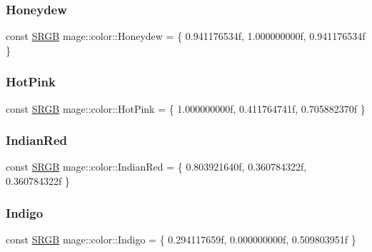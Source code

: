 \subsubsection{\texorpdfstring{Honeydew}{Honeydew}}
{\footnotesize\ttfamily const \hyperlink{structmage_1_1_s_r_g_b}{S\+R\+GB} mage\+::color\+::\+Honeydew = \{ 0.\+941176534f, 1.\+000000000f, 0.\+941176534f \}}

\hypertarget{namespacemage_1_1color_a6c71449f3f78861ed803b42056590c6b}{}\label{namespacemage_1_1color_a6c71449f3f78861ed803b42056590c6b} 
\subsubsection{\texorpdfstring{Hot\+Pink}{HotPink}}
{\footnotesize\ttfamily const \hyperlink{structmage_1_1_s_r_g_b}{S\+R\+GB} mage\+::color\+::\+Hot\+Pink = \{ 1.\+000000000f, 0.\+411764741f, 0.\+705882370f \}}

\hypertarget{namespacemage_1_1color_a2ecd17afc164bd43c8e9235fc1603742}{}\label{namespacemage_1_1color_a2ecd17afc164bd43c8e9235fc1603742} 
\subsubsection{\texorpdfstring{Indian\+Red}{IndianRed}}
{\footnotesize\ttfamily const \hyperlink{structmage_1_1_s_r_g_b}{S\+R\+GB} mage\+::color\+::\+Indian\+Red = \{ 0.\+803921640f, 0.\+360784322f, 0.\+360784322f \}}

\hypertarget{namespacemage_1_1color_a7397ee3a10a75c693c81b667e55f207a}{}\label{namespacemage_1_1color_a7397ee3a10a75c693c81b667e55f207a} 
\subsubsection{\texorpdfstring{Indigo}{Indigo}}
{\footnotesize\ttfamily const \hyperlink{structmage_1_1_s_r_g_b}{S\+R\+GB} mage\+::color\+::\+Indigo = \{ 0.\+294117659f, 0.\+000000000f, 0.\+509803951f \}}

\hypertarget{namespacemage_1_1color_a96cd8c7b824259d3270613b6d6cebcd2}{}\label{namespacemage_1_1color_a96cd8c7b824259d3270613b6d6cebcd2} 
